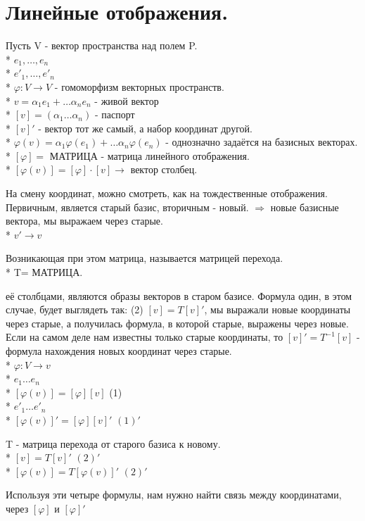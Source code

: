 \documentclass{article}
\begin{document}
\section*{Линейные отображения.}
Пусть  V - вектор пространства над полем P.\\*
$e_1,\ldots,e_n$\\*
$e'_1,\ldots,e'_n$\\*
$\varphi:V\to V$ - гомоморфизм векторных пространств.\\*
$v=\alpha_1e_1+\ldots\alpha_ne_n$ - живой вектор\\*
$[v] = (\alpha_1\ldots\alpha_n)$ - паспорт\\*
$[v]'$ - вектор тот же самый, а набор координат другой.\\*
$\varphi(v)=\alpha_1\varphi(e_1)+\ldots\alpha_n\varphi(e_n)$ - однозначно задаётся на базисных векторах.\\*
$[\varphi]=$ МАТРИЦА - матрица линейного отображения.\\*
$[\varphi(v)]=[\varphi]\cdot[v] \to$ вектор столбец.

На смену координат, можно смотреть, как на тождественные отображения. Первичным, является старый базис, вторичным - новый. $\Rightarrow$ новые базисные вектора, мы выражаем через старые.\\*
$v'\to v$

Возникающая при этом матрица, называется матрицей перехода.\\*
T= МАТРИЦА.

её столбцами, являются образы векторов в старом базисе. Формула один, в этом случае, будет выглядеть так: (2) $[v]=T[v]'$, мы выражали новые координаты через старые, а получилась формула, в которой старые, выражены через новые. Если на самом деле нам известны только старые координаты, то $[v]'=T^{-1}[v]$ - формула нахождения новых координат через старые.\\*
$\varphi:V\to v$\\*
$e_1\ldots e_n$\\*
$[\varphi(v)]=[\varphi][v]$ (1)\\*
$e'_1\ldots e'_n$\\*
$[\varphi(v)]'=[\varphi][v]'$ $(1)'$

T - матрица перехода от старого базиса к новому.\\*
$[v]=T[v]'$ $(2)'$\\*
$[\varphi(v)]=T[\varphi(v)]'$ $(2)'$

Используя эти четыре формулы, нам нужно найти связь между координатами, через $[\varphi]$ и $[\varphi]'$
\end{document}

